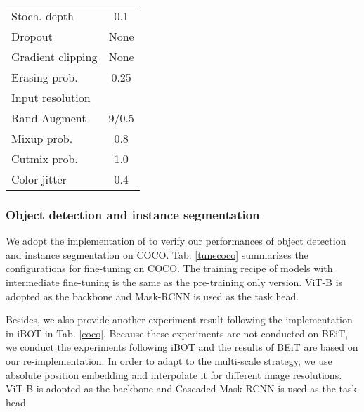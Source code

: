 \documentclass[runningheads]{llncs}
\begin{document}
\begin{table}[h]
{\begin{tabular}{l|cc}
Stoch. depth                   & \multicolumn{2}{c}{0.1}                         \\
Dropout                        & \multicolumn{2}{c}{None}                        \\
Gradient clipping              & \multicolumn{2}{c}{None}                        \\ \hline
Erasing prob.                  & \multicolumn{2}{c}{0.25}                        \\
Input resolution               & \multicolumn{2}{c}{} \\
Rand Augment                   & \multicolumn{2}{c}{9/0.5}                       \\
Mixup prob.                    & \multicolumn{2}{c}{0.8}                         \\
Cutmix prob.                   & \multicolumn{2}{c}{1.0}            \\             
Color jitter           & \multicolumn{2}{c}{0.4}        \\               
\bottomrule[1pt]
\end{tabular}
}
\end{table}



\subsubsection{Object detection and instance segmentation} 

We adopt the implementation of \cite{benchmarking,mimdet} to verify our performances of object detection and instance segmentation on COCO. Tab. \ref{tunecoco} summarizes the configurations for fine-tuning on COCO. The training recipe of models with intermediate fine-tuning is the same as the pre-training only version. ViT-B \cite{vit} is adopted as the backbone and Mask-RCNN \cite{maskrcnn} is used as the task head. 


Besides, we also provide another experiment result following the implementation in iBOT \cite{ibot} in Tab. \ref{coco}. Because these experiments are not conducted on BEiT, we conduct the experiments following iBOT \cite{ibot} and the results of BEiT \cite{beit} are based on our re-implementation. In order to adapt to the multi-scale strategy, we use absolute
position embedding and interpolate it for different image resolutions. ViT-B \cite{vit} is adopted as the backbone and Cascaded Mask-RCNN \cite{maskrcnn,cascade} is used as the task head. 
\end{document}
